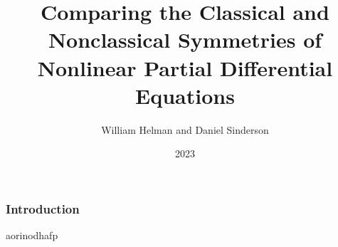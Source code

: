 \documentclass{beamer}
\title{Comparing the Classical and Nonclassical Symmetries of Nonlinear Partial Differential Equations}
\author{William Helman and Daniel Sinderson}
\institute{Southern Oregon University}
\date{2023}
\begin{document}
\frame{\titlepage}

\begin{frame}
\frametitle{Introduction}
aorinodhafp
\end{frame}
\end{document}
